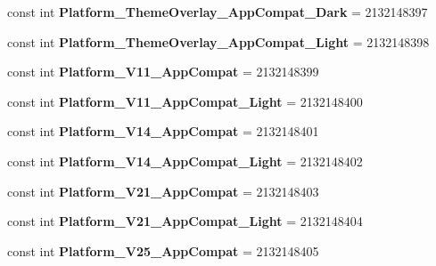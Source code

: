 \begin{DoxyCompactItemize}
const int {\bfseries Platform\+\_\+\+Theme\+Overlay\+\_\+\+App\+Compat\+\_\+\+Dark} = 2132148397
\item 
\mbox{\label{classst_delivery_1_1_resource_1_1_style_ae1e354abbf688f1f58b74d68970694e7}} 
const int {\bfseries Platform\+\_\+\+Theme\+Overlay\+\_\+\+App\+Compat\+\_\+\+Light} = 2132148398
\item 
\mbox{\label{classst_delivery_1_1_resource_1_1_style_a03fbe86e303d648f12e8f0c888175e85}} 
const int {\bfseries Platform\+\_\+\+V11\+\_\+\+App\+Compat} = 2132148399
\item 
\mbox{\label{classst_delivery_1_1_resource_1_1_style_ac186b286edc1a4fed7fd3eff2d9ac9ea}} 
const int {\bfseries Platform\+\_\+\+V11\+\_\+\+App\+Compat\+\_\+\+Light} = 2132148400
\item 
\mbox{\label{classst_delivery_1_1_resource_1_1_style_a98e35e56b3e4ac854bdbb22292e01ddd}} 
const int {\bfseries Platform\+\_\+\+V14\+\_\+\+App\+Compat} = 2132148401
\item 
\mbox{\label{classst_delivery_1_1_resource_1_1_style_aebe8653057a2bdb70b3c389a6e109e4b}} 
const int {\bfseries Platform\+\_\+\+V14\+\_\+\+App\+Compat\+\_\+\+Light} = 2132148402
\item 
\mbox{\label{classst_delivery_1_1_resource_1_1_style_af235e5ad81e59d0a25af1b9346b6d639}} 
const int {\bfseries Platform\+\_\+\+V21\+\_\+\+App\+Compat} = 2132148403
\item 
\mbox{\label{classst_delivery_1_1_resource_1_1_style_a87a005ddb2f277fd33b203115096d1e1}} 
const int {\bfseries Platform\+\_\+\+V21\+\_\+\+App\+Compat\+\_\+\+Light} = 2132148404
\item 
\mbox{\label{classst_delivery_1_1_resource_1_1_style_a34a0a9f006fb2bbe5f5f5e06a411ca13}} 
const int {\bfseries Platform\+\_\+\+V25\+\_\+\+App\+Compat} = 2132148405
\item 
\mbox{\label{classst_delivery_1_1_resource_1_1_style_ae6ec908cecb262d63582474b20360303}} 

\end{DoxyCompactItemize}
